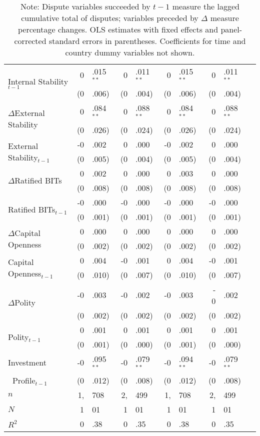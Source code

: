 \documentclass[12pt,onesided]{amsart}
\begin{document}
\begin{table}[ht]
{\begin{tabular}{lr@{} lr@{}lr@{}lr@{}lr@{}}
  \multirow{2}{*}{Internal Stability$_{t-1}$} & 0&.015$^{\ast\ast}$ &  0&.011$^{\ast\ast}$ &  0&.015$^{\ast\ast}$ &  0&.011$^{\ast\ast}$ \\
  & (0&.006) &  (0&.004) &  (0&.006) &  (0&.004) \\
  \multirow{2}{*}{$\Delta$External Stability} & 0&.084$^{\ast\ast}$ & 0&.088$^{\ast\ast}$ &  0&.084$^{\ast\ast}$ &  0&.088$^{\ast\ast}$ \\
  & (0&.026) &  (0&.024) &  (0&.026) &  (0&.024) \\
  \multirow{2}{*}{External Stability$_{t-1}$} & -0&.002 &  0&.000 &  -0&.002 &  0&.000 \\
  & (0&.005) &  (0&.004) &  (0&.005) &  (0&.004) \\
  \multirow{2}{*}{$\Delta$Ratified BITs} & 0&.002 &  0&.000 &  0&.003 &  0&.000 \\
  & (0&.008) &  (0&.008) &  (0&.008) &  (0&.008) \\
  \multirow{2}{*}{Ratified BITs$_{t-1}$} & -0&.000 & -0&.000 &  -0&.000 & -0&.000 \\
  & (0&.001) & (0&.001) &  (0&.001) &  (0&.001) \\
  \multirow{2}{*}{$\Delta$Capital Openness} & 0&.000 & 0&.000 &  0&.000 &  0&.000 \\
  & (0&.002) &  (0&.002) &  (0&.002) &  (0&.002) \\
  \multirow{2}{*}{Capital Openness$_{t-1}$} & 0&.004 & -0&.001 &  0&.004 &  -0&.001 \\
  & (0&.010) & (0&.007) & (0&.010) & (0&.007) \\
  \multirow{2}{*}{$\Delta$Polity} & -0&.003 & -0&.002 &  -0&.003 & - 0&.002  \\
  & (0&.002) & (0&.002) &  (0&.002) &  (0&.002) \\
  \multirow{2}{*}{Polity$_{t-1}$} & 0&.001 & 0&.001 &  0&.001 &  0&.001 \\
  & (0&.001) & (0&.000) &  (0&.001) &  (0&.000) \\
    Investment & -0&.095$^{\ast\ast}$ & -0&.079$^{\ast\ast}$ & -0&.094$^{\ast\ast}$ & -0&.079$^{\ast\ast}$ \\
  $\;\;$Profile$_{t-1}$ & (0&.012) & (0&.008) & (0&.012) & (0&.008) \\
	\hline
	$n$ & 1,&708 & 2,&499 & 1,&708 & 2,&499 \\
	$N$ & 1&01 & 1&01 & 1&01 & 1&01 \\
	$R^{2}$ & 0&.38 & 0&.35 & 0&.38 & 0&.35 \\
	\hline\hline
\end{tabular}
\caption*{Note: Dispute variables succeeded by ${t-1}$ measure the lagged cumulative total of disputes; variables preceded by $\Delta$ measure percentage changes. OLS estimates with fixed effects and panel-corrected standard errors in parentheses. Coefficients for time and country dummy variables not shown.}
}
\end{table}
\end{document}
